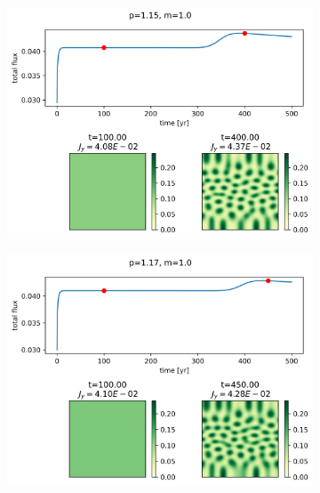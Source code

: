 \documentclass{article}
\numberwithin{equation}{section}
\begin{document}
\begin{figure}[!ht]
    \centering
    \caption{Flux out of the region for various values of $p$.}
    \label{fig:flux_out_precipitation}

    \begin{subfigure}[]{0.5\textwidth}
        \centering
        \includegraphics[scale=0.5]{plots/p1_15_m1_0.png}
        \label{fig:p1_15}
    \end{subfigure}

    \begin{subfigure}[]{0.5\textwidth}
        \centering
        \includegraphics[scale=0.5]{plots/p1_17_m1_0.png}
        \label{fig:p1_17}
    \end{subfigure}


\end{figure}
\end{document}
